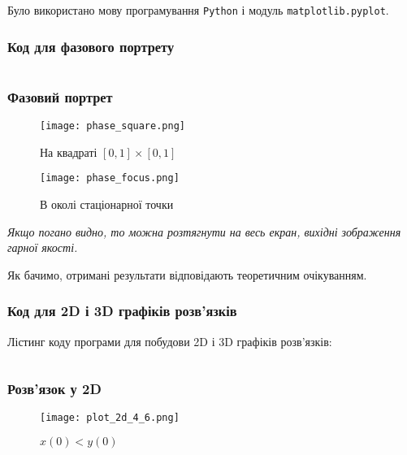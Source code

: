 Було використано мову програмування \texttt{Python} і модуль \texttt{matplotlib.pyplot}.

\subsubsection{Код для фазового портрету}

\inputminted{python}{../py/phase.py}

\newpage

\subsubsection{Фазовий портрет}

\begin{minipage}[t]{.5\textwidth}
	\begin{figure}[H]
		\centering
		\caption{На квадраті $[0, 1] \times [0, 1]$}
		\texttt{[image: phase\_square.png]}
	\end{figure}
\end{minipage}
\begin{minipage}[t]{.5\textwidth}
	\begin{figure}[H]
		\centering
		\caption{В околі стаціонарної точки}
		\texttt{[image: phase\_focus.png]}
	\end{figure}
\end{minipage}

\textit{Якщо погано видно, то можна розтягнути на весь екран, вихідні зображення гарної якості.} \medskip

Як бачимо, отримані результати відповідають теоретичним очікуванням.

\subsubsection{Код для 2D і 3D графіків розв'язків}

Лістинг коду програми для побудови 2D і 3D графіків розв'язків:
\inputminted{python}{../py/plots.py}

\newpage

\subsubsection{Розв'язок у 2D}

\begin{figure}[H]
	\centering
	\caption{$x(0) < y(0)$}
	\texttt{[image: plot\_2d\_4\_6.png]}
\end{figure}

